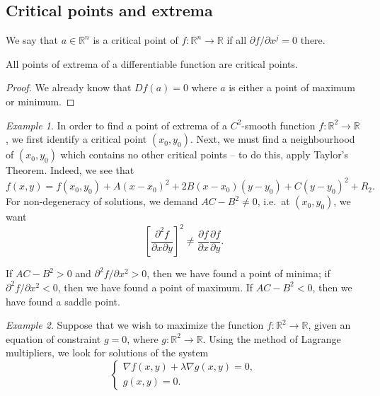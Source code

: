 \documentclass[11pt]{article}
\newcommand{\R}{\mathbb{R}}
\newcommand{\pp}[2]{\frac{\partial #1}{\partial #2}}
\newcommand{\grad}{\nabla}
\theoremstyle{definition}
\theoremstyle{remark}
\newtheorem*{example}{Example}
\numberwithin{equation}{section}
\begin{document}
    \subsection{Critical points and extrema}
    \begin{definition}
        We say that $a \in \R^n$ is a critical point of $f\colon \R^n \to \R$ if all
        $\partial f / \partial x^j = 0$ there.
    \end{definition}

    \begin{lemma}
        All points of extrema of a differentiable function are critical points.
    \end{lemma}
    \begin{proof}
        We already know that $Df(a) = 0$ where $a$ is either a point of maximum or
        minimum.
    \end{proof}

    \begin{example}
        In order to find a point of extrema of a $C^2$-smooth function $f\colon \R^2
        \to \R$, we first identify a critical point $(x_0, y_0)$. Next, we must find
        a neighbourhood of $(x_0, y_0)$ which contains no other critical points -- to
        do this, apply Taylor's Theorem. Indeed, we see that \[
            f(x, y) = f(x_0, y_0) + A(x - x_0)^2 + 2B(x - x_0)(y - y_0) + C(y -
            y_0)^2 + R_2.
        \] For non-degeneracy of solutions, we demand $AC - B^2 \neq 0$, i.e.\ at
        $(x_0, y_0)$, we want \[
            \left[\frac{\partial^2 f}{\partial x \partial y}\right]^2 \neq \pp{f}{x}
            \pp{f}{y}.
        \] 

        If $AC - B^2 > 0$ and $\partial^2f / \partial x^2 > 0$, then we have found a
        point of minima; if $\partial^2 f / \partial x^2 < 0$, then we have found a
        point of maximum. If $AC - B^2 < 0$, then we have found a saddle point.
    \end{example}

    \begin{example}
        Suppose that we wish to maximize the function $f\colon \R^2 \to \R$, given an
        equation of constraint $g = 0$, where $g\colon \R^2 \to \R$. Using the method
        of Lagrange multipliers, we look for solutions of the system \[
            \begin{cases}
                \grad{f}(x, y) + \lambda \grad{g}(x, y) = 0, \\
                g(x, y) = 0.
            \end{cases}
        \]
    \end{example}
\end{document}
